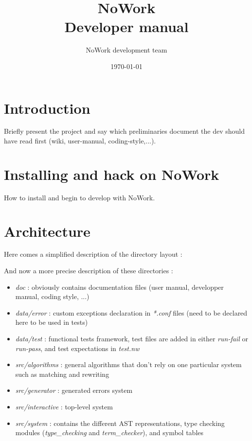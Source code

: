 \documentclass[12pt,a4paper]{article}
\title{NoWork\\
Developer manual}
\author{NoWork development team\\[2em]}
\date\today
\begin{document}
\maketitle

\section{Introduction}
Briefly present the project and say which preliminaries document the dev should have read first (wiki, user-manual, coding-style,...).

\section{Installing and hack on NoWork}
How to install and begin to develop with NoWork.

\section{Architecture}

Here comes a simplified description of the directory layout :
\bigskip

\bigskip

And now a more precise description of these directories :

\begin{itemize}

\item \emph{doc} : obviously contains documentation files (user manual, developper manual, coding style, ...)
\item \emph{data/error} : custom exceptions declaration in \emph{*.conf} files (need to be declared here to be used in tests)
\item \emph{data/test} : functional tests framework, test files are added in either \emph{run-fail} or \emph{run-pass}, and test expectations in \emph{test.nw}
\item \emph{src/algorithms} : general algorithms that don't rely on one particular system such as matching and rewriting
\item \emph{src/generator} : generated errors system
\item \emph{src/interactive} : top-level system
\item \emph{src/system} : contains the different AST representations, type checking modules (\emph{type\_checking} and \emph{term\_checker}), and symbol tables

\end{itemize}
\end{document}
